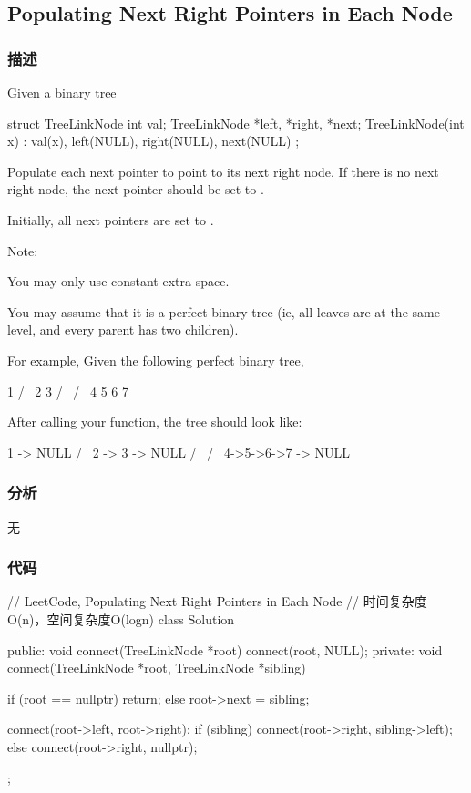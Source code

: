 \subsection{Populating Next Right Pointers in Each Node} %
\label{sec:populating-next-right-pointers-in-each-node}


\subsubsection{描述}
Given a binary tree
\begin{Code}
struct TreeLinkNode {
   int val;
   TreeLinkNode *left, *right, *next;
   TreeLinkNode(int x) : val(x), left(NULL), right(NULL), next(NULL) {}
};
\end{Code}

Populate each next pointer to point to its next right node. If there is no next right node, the next pointer should be set to .

Initially, all next pointers are set to .

Note:
\begindot
\item You may only use constant extra space.
\item You may assume that it is a perfect binary tree (ie, all leaves are at the same level, and every parent has two children).
\myenddot

For example,
Given the following perfect binary tree,
\begin{Code}
         1
       /  \
      2    3
     / \  / \
    4  5  6  7
\end{Code}

After calling your function, the tree should look like:
\begin{Code}
         1 -> NULL
       /  \
      2 -> 3 -> NULL
     / \  / \
    4->5->6->7 -> NULL
\end{Code}


\subsubsection{分析}
无

\subsubsection{代码}

\begin{Code}
// LeetCode, Populating Next Right Pointers in Each Node
// 时间复杂度O(n)，空间复杂度O(logn)
class Solution {
public:
    void connect(TreeLinkNode *root) {
        connect(root, NULL);
    }
private:
    void connect(TreeLinkNode *root, TreeLinkNode *sibling) {
        if (root == nullptr)
            return;
        else
            root->next = sibling;

        connect(root->left, root->right);
        if (sibling)
            connect(root->right, sibling->left);
        else
            connect(root->right, nullptr);
    }
};
\end{Code}


